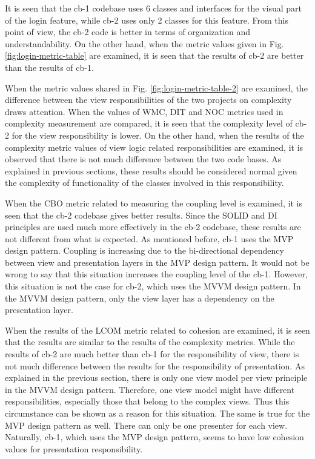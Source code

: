 It is seen that the cb-1 codebase uses 6 classes and interfaces for the visual part of the login feature, while cb-2 uses only 2 classes for this feature. From this point of view, the cb-2 code is better in terms of organization and understandability. On the other hand, when the metric values given in Fig. \ref{fig:login-metric-table} are examined, it is seen that the results of cb-2 are better than the results of cb-1.

When the metric values shared in Fig. \ref{fig:login-metric-table-2} are examined, the difference between the view responsibilities of the two projects on complexity draws attention. When the values of WMC, DIT and NOC metrics used in complexity measurement are compared, it is seen that the complexity level of cb-2 for the view responsibility is lower. On the other hand, when the results of the complexity metric values of view logic related responsibilities are examined, it is observed that there is not much difference between the two code bases. As explained in previous sections, these results should be considered normal given the complexity of functionality of the classes involved in this responsibility.

When the CBO metric related to measuring the coupling level is examined, it is seen that the cb-2 codebase gives better results. Since the SOLID and DI principles are used much more effectively in the cb-2 codebase, these results are not different from what is expected. As mentioned before, cb-1 uses the MVP design pattern. Coupling is increasing due to the bi-directional dependency between view and presentation layers in the MVP design pattern. It would not be wrong to say that this situation increases the coupling level of the cb-1. However, this situation is not the case for cb-2, which uses the MVVM design pattern. In the MVVM design pattern, only the view layer has a dependency on the presentation layer.

When the results of the LCOM metric related to cohesion are examined, it is seen that the results are similar to the results of the complexity metrics. While the results of cb-2 are much better than cb-1 for the responsibility of view, there is not much difference between the results for the responsibility of presentation. As explained in the previous section, there is only one view model per view principle in the MVVM design pattern. Therefore, one view model might have different responsibilities, especially those that belong to the complex views. Thus this circumstance can be shown as a reason for this situation. The same is true for the MVP design pattern as well. There can only be one presenter for each view. Naturally, cb-1, which uses the MVP design pattern, seems to have low cohesion values for presentation responsibility.